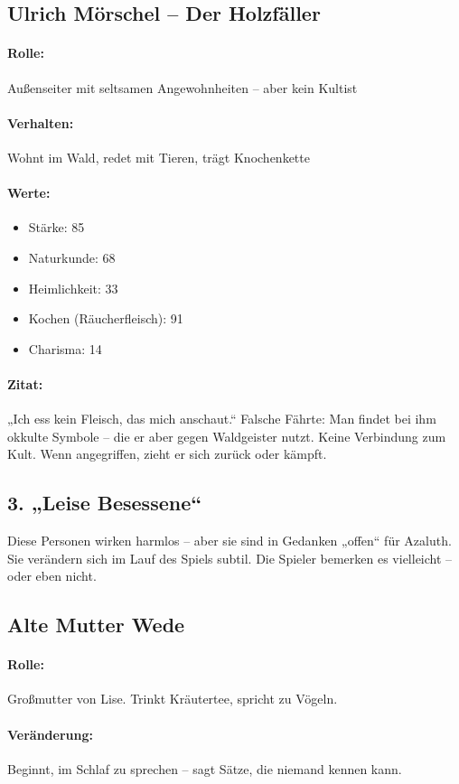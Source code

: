 \newpage
\subsection{Ulrich Mörschel – Der Holzfäller}
\paragraph{Rolle:} Außenseiter mit seltsamen Angewohnheiten – aber kein Kultist
\paragraph{Verhalten:} Wohnt im Wald, redet mit Tieren, trägt Knochenkette
\paragraph{Werte:}
\begin{itemize}
\item Stärke: 85
\item Naturkunde: 68
\item Heimlichkeit: 33
\item Kochen (Räucherfleisch): 91
\item Charisma: 14
\end{itemize}
\paragraph{Zitat:}
„Ich ess kein Fleisch, das mich anschaut.“
Falsche Fährte: Man findet bei ihm okkulte Symbole – die er aber gegen Waldgeister nutzt. Keine Verbindung zum Kult. Wenn angegriffen, zieht er sich zurück oder kämpft.

\newpage
\subsection*{3. „Leise Besessene“}
Diese Personen wirken harmlos – aber sie sind in Gedanken „offen“ für Azaluth. Sie verändern sich im Lauf des Spiels subtil. Die Spieler bemerken es vielleicht – oder eben nicht.

\subsection{Alte Mutter Wede}
\paragraph{Rolle:} Großmutter von Lise. Trinkt Kräutertee, spricht zu Vögeln.
\paragraph{Veränderung:} Beginnt, im Schlaf zu sprechen – sagt Sätze, die niemand kennen kann.
